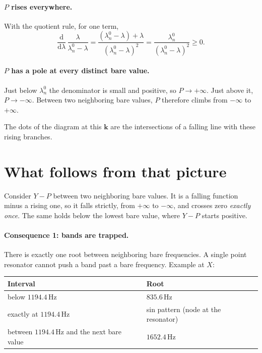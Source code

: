\paragraph{$P$ rises everywhere.} With the quotient rule, for one term,
\begin{equation}
  \frac{\mathrm{d}}{\mathrm{d}\lambda}\,\frac{\lambda}{\lambda_n^0 - \lambda}
  = \frac{(\lambda_n^0 - \lambda) + \lambda}{(\lambda_n^0 - \lambda)^2}
  = \frac{\lambda_n^0}{(\lambda_n^0 - \lambda)^2} \ge 0 .
\end{equation}

\paragraph{$P$ has a pole at every distinct bare value.}
Just below $\lambda_n^0$ the denominator is small and positive, so
$P \to +\infty$. Just above it, $P \to -\infty$. Between two neighboring bare
values, $P$ therefore climbs from $-\infty$ to $+\infty$.

The dots of the diagram at this $\mathbf{k}$ are the intersections of a falling
line with these rising branches.

\section{What follows from that picture}

Consider $Y - P$ between two neighboring bare values. It is a falling function
minus a rising one, so it falls strictly, from $+\infty$ to $-\infty$, and
crosses zero \emph{exactly once}. The same holds below the lowest bare value,
where $Y - P$ starts positive.

\paragraph{Consequence 1: bands are trapped.}
There is exactly one root between neighboring bare frequencies. A single point
resonator cannot push a band past a bare frequency. Example at $X$:
\begin{center}
\begin{tabular}{|p{}|p{}|}
\hline
Interval & Root \\
\hline
below $1194.4\,\mathrm{Hz}$ & $835.6\,\mathrm{Hz}$ \\
exactly at $1194.4\,\mathrm{Hz}$ & sin pattern (node at the resonator) \\
between $1194.4\,\mathrm{Hz}$ and the next bare value & $1652.4\,\mathrm{Hz}$ \\
\hline
\end{tabular}
\end{center}

